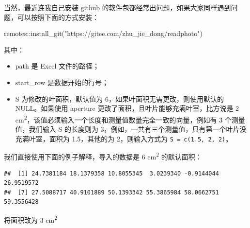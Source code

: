 \documentclass[
]{krantz}
\makeatletter
\newenvironment{Shaded}{\begin{snugshade}}{\end{snugshade}}
\newcommand{\AttributeTok}[1]{\textcolor[rgb]{0.77,0.63,0.00}{#1}}
\newcommand{\DecValTok}[1]{\textcolor[rgb]{0.00,0.00,0.81}{#1}}
\newcommand{\FunctionTok}[1]{\textcolor[rgb]{0.00,0.00,0.00}{#1}}
\newcommand{\NormalTok}[1]{#1}
\newcommand{\OtherTok}[1]{\textcolor[rgb]{0.56,0.35,0.01}{#1}}
\newcommand{\SpecialCharTok}[1]{\textcolor[rgb]{0.00,0.00,0.00}{#1}}
\newcommand{\StringTok}[1]{\textcolor[rgb]{0.31,0.60,0.02}{#1}}
\newenvironment{kframe}{%
\medskip{}
\setlength{\fboxsep}{.8em}
 \def\at@end@of@kframe{}%
 \ifinner\ifhmode%
  \def\at@end@of@kframe{\end{minipage}}%
  \begin{minipage}{\columnwidth}%
 \fi\fi%
 \def\FrameCommand##1{\hskip\@totalleftmargin \hskip-\fboxsep
 \colorbox{shadecolor}{##1}\hskip-\fboxsep
     \hskip-\linewidth \hskip-\@totalleftmargin \hskip\columnwidth}%
 \MakeFramed {\advance\hsize-\width
   \@totalleftmargin\z@ \linewidth\hsize
   \@setminipage}}%
 {\par\unskip\endMakeFramed%
 \at@end@of@kframe}
\renewenvironment{Shaded}{\begin{kframe}}{\end{kframe}}
\makeatother
\begin{document}
当然，最近连我自己安装 github 的软件包都经常出问题，如果大家同样遇到问题，可以按照下面的方式安装：

\begin{Shaded}
\begin{Highlighting}[]
\NormalTok{remotes}\SpecialCharTok{::}\FunctionTok{install\_git}\NormalTok{(}\StringTok{"https://gitee.com/zhu\_jie\_dong/readphoto"}\NormalTok{)}
\end{Highlighting}
\end{Shaded}

其中：

\begin{itemize}
\item
  path 是 Excel 文件的路径；
\item
  start\_row 是数据开始的行号；
\item
  S 为修改的叶面积，默认值为 6，如果叶面积无需更改，则使用默认的 NULL。如果使用 aperture 更改了面积，且叶片能够充满叶室，比方说是 2 cm\textsuperscript{2}，该值必须输入一个长度和测量值数量完全一致的向量，例如有 3 个测量值，我们输入 S 的长度则为 3，例如，一共有三个测量值，只有第一个叶片没充满叶室，面积为 1.5，其他的为 2，则输入方式为 \texttt{S\ =\ c(1.5,\ 2,\ 2)}。
\end{itemize}

我们直接使用下面的例子解释，导入的数据是 6 cm\textsuperscript{2} 的默认面积：

\begin{Shaded}
\end{Shaded}

\begin{verbatim}
##  [1] 24.7381184 18.1379358 10.8055345  3.0239340 -0.9144044 26.9519572
##  [7] 27.5088717 40.9101889 50.1393342 55.3865984 58.0662751 59.3556428
\end{verbatim}

将面积改为 3 cm\textsuperscript{2}

\begin{Shaded}
\end{Shaded}
\end{document}
